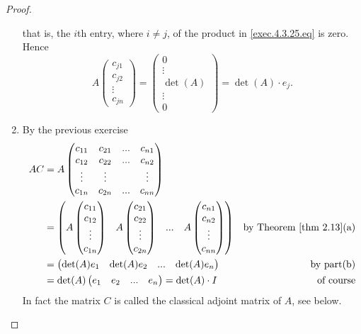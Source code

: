 \begin{proof}
\begin{enumerate}
that is, the \(i\)th entry, where \(i \ne j\), of the product in \ref{exec.4.3.25.eq} is zero.
Hence
\[
    A \begin{pmatrix} c_{j1} \\ c_{j2} \\ \vdots \\ c_{jn} \end{pmatrix} = \begin{pmatrix}
        0 \\ \vdots \\ \det(A) \\ \vdots \\ 0
    \end{pmatrix} = \det(A) \cdot e_j.
\]

\item By the previous exercise
\begin{align*}
    AC & = A \begin{pmatrix}
            c_{11} & c_{21} & ... & c_{n1} \\
            c_{12} & c_{22} & ... & c_{n2} \\
            \vdots & \vdots &     & \vdots \\
            c_{1n} & c_{2n} & ... & c_{nn}
           \end{pmatrix} \\
       & = \begin{pmatrix}
           A \begin{pmatrix} c_{11} \\ c_{12} \\ \vdots \\ c_{1n} \end{pmatrix}
           & A \begin{pmatrix} c_{21} \\ c_{22} \\ \vdots \\ c_{2n} \end{pmatrix}
           & ...
           & A \begin{pmatrix} c_{n1} \\ c_{n2} \\ \vdots \\ c_{nn} \end{pmatrix}
       \end{pmatrix} & \text{by \THM{2.13}(a)} \\
       & = \begin{pmatrix}
           \det(A) e_1 & \det(A) e_2 & ... & \det(A) e_n
       \end{pmatrix} & \text{by part(b)} \\
       & = \det(A) \begin{pmatrix} e_1 & e_2 & ... & e_n \end{pmatrix} = \det(A) \cdot I & \text{of course}
\end{align*}
In fact the matrix \(C\) is called the classical adjoint matrix of \(A\), see  below.


\end{enumerate}
\end{proof}

